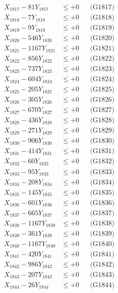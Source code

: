 \documentclass[a4paper,10pt]{article}
\begin{document}
{\begin{align}
X_{1817} - 81Y_{1817} &\leq +0 && \text{(G1817)} \\
X_{1818} - 7Y_{1818} &\leq +0 && \text{(G1818)} \\
X_{1819} - 9Y_{1819} &\leq +0 && \text{(G1819)} \\
X_{1820} - 546Y_{1820} &\leq +0 && \text{(G1820)} \\
\allowbreak
X_{1821} - 1167Y_{1821} &\leq +0 && \text{(G1821)} \\
X_{1822} - 856Y_{1822} &\leq +0 && \text{(G1822)} \\
X_{1823} - 737Y_{1823} &\leq +0 && \text{(G1823)} \\
X_{1824} - 604Y_{1824} &\leq +0 && \text{(G1824)} \\
X_{1825} - 205Y_{1825} &\leq +0 && \text{(G1825)} \\
X_{1826} - 305Y_{1826} &\leq +0 && \text{(G1826)} \\
X_{1827} - 670Y_{1827} &\leq +0 && \text{(G1827)} \\
X_{1828} - 436Y_{1828} &\leq +0 && \text{(G1828)} \\
X_{1829} - 271Y_{1829} &\leq +0 && \text{(G1829)} \\
X_{1830} - 906Y_{1830} &\leq +0 && \text{(G1830)} \\
\allowbreak
X_{1831} - 414Y_{1831} &\leq +0 && \text{(G1831)} \\
X_{1832} - 60Y_{1832} &\leq +0 && \text{(G1832)} \\
X_{1833} - 95Y_{1833} &\leq +0 && \text{(G1833)} \\
X_{1834} - 208Y_{1834} &\leq +0 && \text{(G1834)} \\
X_{1835} - 145Y_{1835} &\leq +0 && \text{(G1835)} \\
X_{1836} - 601Y_{1836} &\leq +0 && \text{(G1836)} \\
X_{1837} - 665Y_{1837} &\leq +0 && \text{(G1837)} \\
X_{1838} - 1167Y_{1838} &\leq +0 && \text{(G1838)} \\
X_{1839} - 361Y_{1839} &\leq +0 && \text{(G1839)} \\
X_{1840} - 1167Y_{1840} &\leq +0 && \text{(G1840)} \\
\allowbreak
X_{1841} - 420Y_{1841} &\leq +0 && \text{(G1841)} \\
X_{1842} - 986Y_{1842} &\leq +0 && \text{(G1842)} \\
X_{1843} - 207Y_{1843} &\leq +0 && \text{(G1843)} \\
X_{1844} - 26Y_{1844} &\leq +0 && \text{(G1844)} \\

\end{align}}
\end{document}
